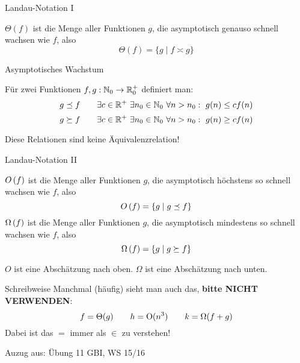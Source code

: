 \begin{frame}{Landau-Notation I}
	\begin{Definition}
		$\Theta(f)$ ist die Menge aller Funktionen $g$, die asymptotisch genauso schnell wachsen wie $f$, also $$\Theta(f)  = \{ g \mid f \asymp g \}$$
	\end{Definition}
	
	\medskip
\end{frame}


\begin{frame}{Asymptotisches Wachstum}
	\begin{Definition}
		Für zwei Funktionen $f,g: \mathbb{N}_0 \to \mathbb{R}_0^+$ definiert man:
		$$g \preceq f \qquad \exists c \in \mathbb{R}^+ \ \exists n_0 \in \mathbb{N}_0 \ \forall n > n_0: \ g(n) \leq c f(n)$$
		$$g \succeq f \qquad \exists c \in \mathbb{R}^+ \ \exists n_0 \in \mathbb{N}_0 \ \forall n > n_0: \ g(n) \geq c f(n)$$
	\end{Definition} \pause
	Diese Relationen sind keine Äquivalenzrelation!
\end{frame}

\begin{frame}{Landau-Notation II}
	\begin{Definition}
		$O\left(f\right)$ ist die Menge aller Funktionen $g$, die asymptotisch höchstens so schnell wachsen wie $f$, also $$O\left(f\right)  = \{ g \mid g \preceq f \}$$
		$\Omega\left(f\right)$ ist die Menge aller Funktionen $g$, die asymptotisch mindestens so schnell wachsen wie $f$, also $$\Omega\left(f\right)  = \{ g \mid g \succeq f \}$$
	\end{Definition} \pause
	$O$ ist eine Abschätzung nach oben. $\Omega$ ist eine Abschätzung nach unten.
\end{frame}


\begin{frame}{Schreibweise}
	Manchmal (häufig) sieht man auch das, \textbf{bitte NICHT VERWENDEN}:
	$$f = \Theta(g) \qquad h = \text{O}(n^3) \qquad k = \Omega(f + g)$$
	\pause
	Dabei ist das $=$ immer als $\in$ zu verstehen!
\end{frame}

\begin{frame}{}
	Auzug aus:
	Übung 11 GBI, WS 15/16
\end{frame}



